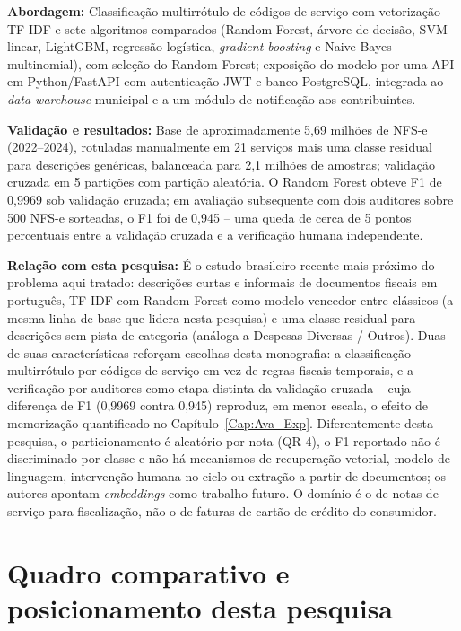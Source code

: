 \textbf{Abordagem:} Classificação multirrótulo de códigos de serviço com vetorização TF-IDF e sete algoritmos comparados (Random Forest, árvore de decisão, SVM linear, LightGBM, regressão logística, \textit{gradient boosting} e Naive Bayes multinomial), com seleção do Random Forest; exposição do modelo por uma API em Python/FastAPI com autenticação JWT e banco PostgreSQL, integrada ao \textit{data warehouse} municipal e a um módulo de notificação aos contribuintes.

\textbf{Validação e resultados:} Base de aproximadamente 5,69 milhões de NFS-e (2022--2024), rotuladas manualmente em 21 serviços mais uma classe residual para descrições genéricas, balanceada para 2,1 milhões de amostras; validação cruzada em 5 partições com partição aleatória. O Random Forest obteve F1 de 0,9969 sob validação cruzada; em avaliação subsequente com dois auditores sobre 500 NFS-e sorteadas, o F1 foi de 0,945 -- uma queda de cerca de 5 pontos percentuais entre a validação cruzada e a verificação humana independente.

\textbf{Relação com esta pesquisa:} É o estudo brasileiro recente mais próximo do problema aqui tratado: descrições curtas e informais de documentos fiscais em português, TF-IDF com Random Forest como modelo vencedor entre clássicos (a mesma linha de base que lidera nesta pesquisa) e uma classe residual para descrições sem pista de categoria (análoga a Despesas Diversas / Outros). Duas de suas características reforçam escolhas desta monografia: a classificação multirrótulo por códigos de serviço em vez de regras fiscais temporais, e a verificação por auditores como etapa distinta da validação cruzada -- cuja diferença de F1 (0,9969 contra 0,945) reproduz, em menor escala, o efeito de memorização quantificado no Capítulo~\ref{Cap:Ava_Exp}. Diferentemente desta pesquisa, o particionamento é aleatório por nota (QR-4), o F1 reportado não é discriminado por classe e não há mecanismos de recuperação vetorial, modelo de linguagem, intervenção humana no ciclo ou extração a partir de documentos; os autores apontam \textit{embeddings} como trabalho futuro. O domínio é o de notas de serviço para fiscalização, não o de faturas de cartão de crédito do consumidor.

\section{Quadro comparativo e posicionamento desta pesquisa}
\label{sec:rel_quadro_comparativo}

